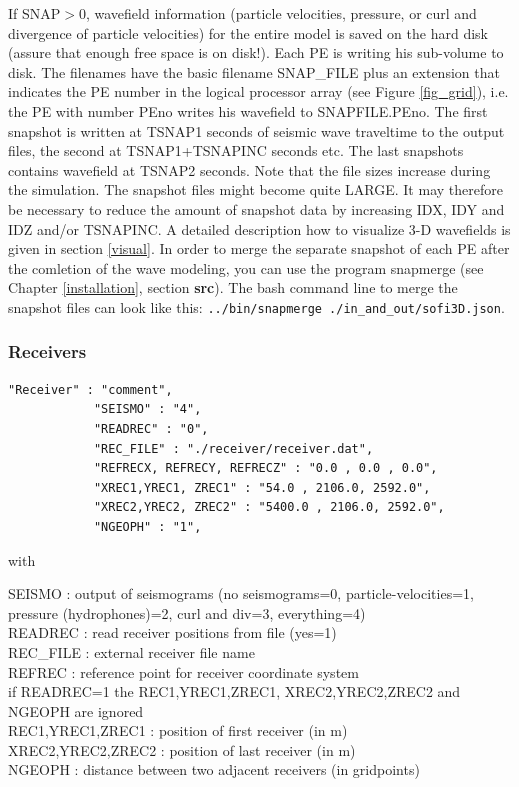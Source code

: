 \documentclass[11pt,onecolumn,oneside]{article}
\begin{document}
If SNAP$>0$, wavefield information (particle velocities, pressure, or curl and divergence of particle velocities) for the entire model is saved on the hard disk (assure that enough free space is on disk!). Each PE is writing his sub-volume to disk. The filenames have the basic filename SNAP\_FILE plus an extension that indicates the PE number in the logical processor array (see Figure \ref{fig_grid}), i.e. the PE with number PEno writes his wavefield to SNAPFILE.PEno. The first snapshot is written at TSNAP1 seconds of seismic wave traveltime to the output files, the second at TSNAP1+TSNAPINC seconds etc. The last snapshots contains wavefield at TSNAP2 seconds. Note that the file sizes increase during the simulation. The snapshot files might become quite LARGE. It may therefore be necessary to reduce the amount of snapshot data by increasing IDX, IDY and IDZ and/or TSNAPINC. A detailed description how to visualize 3-D wavefields is given in section \ref{visual}. In order to merge the separate snapshot of each PE after the comletion of the wave modeling, you can use the program snapmerge (see Chapter \ref{installation}, section \textbf{src}). The bash command line to merge the snapshot files can look like this:  \lstinline{../bin/snapmerge ./in_and_out/sofi3D.json}.

\subsubsection{Receivers}
\label{Receivers}
\begin{verbatim}
"Receiver" : "comment",
            "SEISMO" : "4",
            "READREC" : "0",
            "REC_FILE" : "./receiver/receiver.dat",
            "REFRECX, REFRECY, REFRECZ" : "0.0 , 0.0 , 0.0",
            "XREC1,YREC1, ZREC1" : "54.0 , 2106.0, 2592.0",
            "XREC2,YREC2, ZREC2" : "5400.0 , 2106.0, 2592.0",
            "NGEOPH" : "1",
\end{verbatim}

with 

SEISMO : output of seismograms (no seismograms=0, particle-velocities=1, pressure (hydrophones)=2, curl and div=3, everything=4)\\
READREC : read receiver positions from file (yes=1)\\
REC\_FILE : external receiver file name\\
REFREC : reference point for receiver coordinate system\\
if READREC=1 the REC1,YREC1,ZREC1, XREC2,YREC2,ZREC2 and NGEOPH are ignored\\ 
REC1,YREC1,ZREC1 : position of first receiver (in m)\\
XREC2,YREC2,ZREC2 : position of last receiver (in m)\\
NGEOPH : distance between two adjacent receivers (in gridpoints)\\
\end{document}
